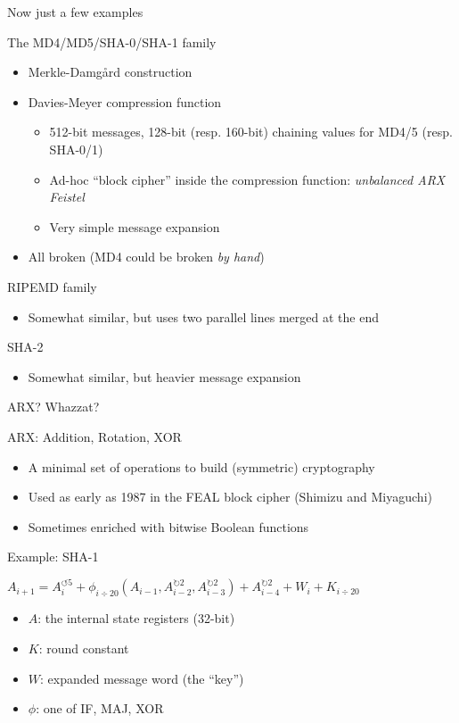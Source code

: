 \documentclass[xcolor=table,usenames,dvipsnames,compress]{beamer}
\begin{document}
\begin{frame}{Now just a few examples}
\vspace{-6mm}

The MD4/MD5/SHA-0/SHA-1 family

\begin{itemize}
\item Merkle-Damg\aa rd construction 
\item Davies-Meyer compression function
\begin{itemize}
\item 512-bit messages, 128-bit (resp. 160-bit) chaining values for MD4/5 (resp. SHA-0/1)
\item Ad-hoc ``block cipher'' inside the compression function: \emph{unbalanced ARX Feistel}
\item Very simple message expansion
\end{itemize}
\item All broken (MD4 could be broken \emph{by hand})
\end{itemize}

RIPEMD family
\begin{itemize}
\item Somewhat similar, but uses two parallel lines merged at the end
\end{itemize}

SHA-2
\begin{itemize}
\item Somewhat similar, but heavier message expansion
\end{itemize}
\end{frame}

\begin{frame}{ARX? Whazzat?}

\vspace{-4mm}

ARX: Addition, Rotation, XOR
\begin{itemize}
\item A minimal set of operations to build (symmetric) cryptography
\item Used as early as 1987 in the FEAL block cipher (Shimizu and Miyaguchi)
\item Sometimes enriched with bitwise Boolean functions
\end{itemize}

\medskip

Example: SHA-1\\

\smallskip

$A_{i+1} = A_i^{\circlearrowleft 5} + \phi_{i\div20}(A_{i-1}, A_{i-2}^{\circlearrowright 2}, A_{i-3}^{\circlearrowright 2}) + A_{i-4}^{\circlearrowright 2} + W_i +K_{i\div20}$
\begin{itemize}
\item $A$: the internal state registers (32-bit)
\item $K$: round constant
\item $W$: expanded message word (the ``key'')
\item $\phi$: one of IF, MAJ, XOR
\end{itemize}
\end{frame}
\end{document}
